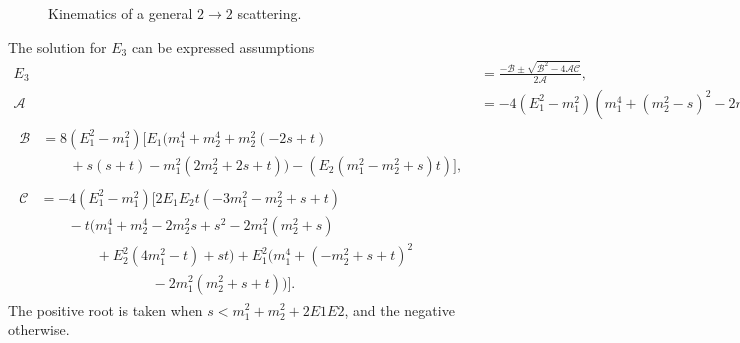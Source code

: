 \begin{figure}[t!bp]
    \centering
    \caption{Kinematics of a general $2\rightarrow 2$ scattering.}
    \label{app:fig:2-2kin}
\end{figure}

The solution for $E_3$ can be expressed assumptions
\begin{align}
    E_3 & = \frac{-\mathcal{B} \pm \sqrt{\mathcal{B}^2 - 4 \mathcal{A}\mathcal{C}}}{2\mathcal{A}},\\
    \mathcal{A} & = -4(E_1^2 - m_1^2)(m_1^4 + (m_2^2 - s)^2 - 2m_1^2(m_2^2 + s))\\
    \begin{split}
        \mathcal{B} & = 8(E_1^2 - m_1^2)[E_1(m_1^4 + m_2^4 + m_2^2(-2s + t) \\
        & \hspace{2em}+ s(s + t) - m_1^2(2m_2^2 + 2s + t))-(E_2(m_1^2 - m_2^2 + s)t)],
    \end{split}\\
    \begin{split}
        \mathcal{C} & = -4(E_1^2 - m_1^2)[2E_1E_2t(-3m_1^2 - m_2^2 + s + t) \\
        &\hspace{2em} - t(m_1^4 + m_2^4 - 2m_2^2s + s^2 - 2m_1^2(m_2^2 + s)  \\
        &\hspace{4em} + E_2^2(4m_1^2 - t) + st) + E_1^2(m_1^4 + (-m_2^2 + s + t)^2 \\
        &\hspace{8em} - 2m_1^2(m_2^2 + s + t))].
    \end{split}
\end{align}
The positive root is taken when $s < m_1^2 + m_2^2 + 2 E1 E2$, and the negative otherwise. 

